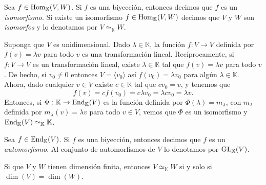 \begin{defn}
Sea $f\in\operatorname{Hom}_{\mathbb{K}}(V,W)$. Si $f$ es una biyecci\'on, entonces decimos que $f$ es un \emph{isomorfismo}. Si existe un isomorfismo $f\in\operatorname{Hom}_{\mathbb{K}}(V,W)$ decimos que $V$ y $W$ son \emph{isomorfos} y lo denotamos por $V\simeq_{\mathbb{K}} W$.
\end{defn}

\begin{ejem} Suponga que $V$ es unidimensional. Dado $\lambda\in \mathbb{K}$, la funci\'on $f:V\rightarrow V$ definida por $f(v)=\lambda v$ para todo $v$ es una transformaci\'on lineal. Rec\'iprocamente, si $f:V\rightarrow V$ es un transformaci\'on lineal, existe $\lambda\in \mathbb{K}$ tal que $f(v)=\lambda v$ para todo $v$. De hecho, si $v_0\ne 0$ entonces $V=\langle v_0\rangle$ as\'i $f(v_0)=\lambda v_0$ para alg\'un $\lambda\in \mathbb{K}$. Ahora, dado cualquier $v\in V$ existe $c\in \mathbb{K}$ tal que $cv_0=v$, y tenemos que
\[
f(v)=cf(v_0)=c\lambda v_0=\lambda cv_0=\lambda v.
\]
Entonces, si $\Phi: \mathbb{K} \rightarrow \operatorname{End}_{\mathbb{K}}(V)$ es la funci\'on definida por $\Phi(\lambda)=m_\lambda$, con $m_\lambda$ definida por $m_\lambda(v)=\lambda v$ para todo $v\in V$, vemos que $\Phi$ es un isomorfismo y $\operatorname{End}_{\mathbb{K}}(V)\simeq_{\mathbb{K}} \mathbb{K}$.
\end{ejem}

\begin{defn}
Sea $f\in\operatorname{End}_{\mathbb{K}}(V)$. Si $f$ es una biyecci\'on, entonces decimos que $f$ es un \emph{automorfismo}. Al conjunto de automorfismos de $V$ lo denotamos por $\operatorname{GL}_{\mathbb{K}}(V)$.
\end{defn}

\begin{teo}
Si que $V$ y $W$ tienen dimensi\'on finita, entonces $V\simeq_{\mathbb{K}} W$ si y solo si $\dim(V)=\dim(W)$.
\end{teo}

